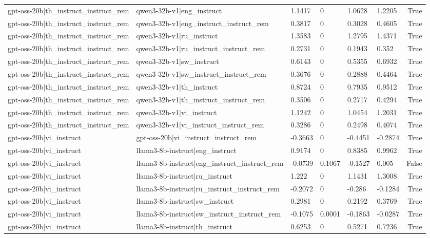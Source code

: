 \begin{table}
\begin{tabular}{llllllr}
gpt-oss-20b|th_instruct_instruct_rem & qwen3-32b-v1|eng_instruct & 1.1417 & 0 & 1.0628 & 1.2205 & True \\
gpt-oss-20b|th_instruct_instruct_rem & qwen3-32b-v1|eng_instruct_instruct_rem & 0.3817 & 0 & 0.3028 & 0.4605 & True \\
gpt-oss-20b|th_instruct_instruct_rem & qwen3-32b-v1|ru_instruct & 1.3583 & 0 & 1.2795 & 1.4371 & True \\
gpt-oss-20b|th_instruct_instruct_rem & qwen3-32b-v1|ru_instruct_instruct_rem & 0.2731 & 0 & 0.1943 & 0.352 & True \\
gpt-oss-20b|th_instruct_instruct_rem & qwen3-32b-v1|sw_instruct & 0.6143 & 0 & 0.5355 & 0.6932 & True \\
gpt-oss-20b|th_instruct_instruct_rem & qwen3-32b-v1|sw_instruct_instruct_rem & 0.3676 & 0 & 0.2888 & 0.4464 & True \\
gpt-oss-20b|th_instruct_instruct_rem & qwen3-32b-v1|th_instruct & 0.8724 & 0 & 0.7935 & 0.9512 & True \\
gpt-oss-20b|th_instruct_instruct_rem & qwen3-32b-v1|th_instruct_instruct_rem & 0.3506 & 0 & 0.2717 & 0.4294 & True \\
gpt-oss-20b|th_instruct_instruct_rem & qwen3-32b-v1|vi_instruct & 1.1242 & 0 & 1.0454 & 1.2031 & True \\
gpt-oss-20b|th_instruct_instruct_rem & qwen3-32b-v1|vi_instruct_instruct_rem & 0.3286 & 0 & 0.2498 & 0.4074 & True \\
gpt-oss-20b|vi_instruct & gpt-oss-20b|vi_instruct_instruct_rem & -0.3663 & 0 & -0.4451 & -0.2874 & True \\
gpt-oss-20b|vi_instruct & llama3-8b-instruct|eng_instruct & 0.9174 & 0 & 0.8385 & 0.9962 & True \\
gpt-oss-20b|vi_instruct & llama3-8b-instruct|eng_instruct_instruct_rem & -0.0739 & 0.1067 & -0.1527 & 0.005 & False \\
gpt-oss-20b|vi_instruct & llama3-8b-instruct|ru_instruct & 1.222 & 0 & 1.1431 & 1.3008 & True \\
gpt-oss-20b|vi_instruct & llama3-8b-instruct|ru_instruct_instruct_rem & -0.2072 & 0 & -0.286 & -0.1284 & True \\
gpt-oss-20b|vi_instruct & llama3-8b-instruct|sw_instruct & 0.2981 & 0 & 0.2192 & 0.3769 & True \\
gpt-oss-20b|vi_instruct & llama3-8b-instruct|sw_instruct_instruct_rem & -0.1075 & 0.0001 & -0.1863 & -0.0287 & True \\
gpt-oss-20b|vi_instruct & llama3-8b-instruct|th_instruct & 0.6253 & 0 & 0.5271 & 0.7236 & True \\

\end{tabular}
\end{table}
